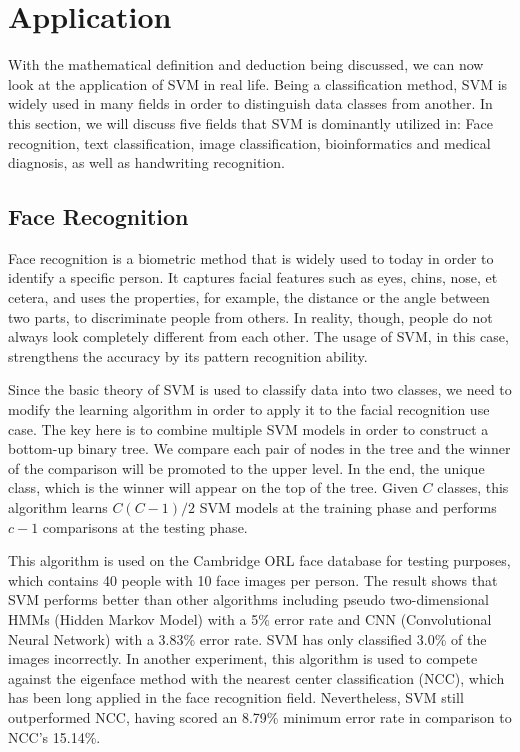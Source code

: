 \section{Application}
With the mathematical definition and deduction being discussed, we can now
look at the application of SVM in real life. Being a classification method,
SVM is widely used in many fields in order to distinguish data classes from
another. In this section, we will discuss five fields that SVM is dominantly
utilized in: Face recognition, text classification, image classification,
bioinformatics and medical diagnosis, as well as handwriting recognition.

\subsection*{Face Recognition}
Face recognition is a biometric method that is widely used to today in order
to identify a specific
person. It captures facial features such as eyes, chins, nose, et cetera, and
uses the properties, for example, the distance or the angle between two parts, 
to discriminate people from others. In reality, though, people do not always
look completely different from each other. The usage of SVM, 
in this case, strengthens the accuracy by its pattern recognition ability.

Since the basic theory of SVM is used to classify data into two classes, we
need to modify the learning algorithm in order to apply it to the facial
recognition use case. The key here is to combine multiple SVM models in order
to construct a bottom-up binary tree. We compare each pair of nodes in the
tree and the winner of the comparison will be promoted to the upper level.
In the end, the unique class, which is the winner will appear on the top of 
the tree. Given $C$ classes, this algorithm learns $C(C-1)/2$ SVM models at
the training phase and performs $c-1$ comparisons at the testing phase.

This algorithm is used on the Cambridge ORL face database for testing purposes, 
which contains 40 people with 10 face images per person.
The result shows that SVM performs better than other algorithms including
pseudo two-dimensional HMMs (Hidden Markov Model) with a 5\% error rate 
and CNN (Convolutional Neural Network) with a 3.83\% error rate. SVM has
only classified 3.0\% of the images incorrectly. In another experiment,
this algorithm is used to compete against the eigenface method
with the nearest center classification (NCC), which has been long applied
in the face recognition field. Nevertheless, SVM still outperformed NCC,
having scored an 8.79\% minimum error rate in comparison to NCC's 15.14\%.
\cite{face-recognition}

